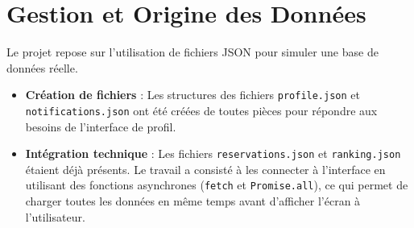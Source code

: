\documentclass[12pt,a4paper]{article}
\begin{document}
\section*{Gestion et Origine des Données}
Le projet repose sur l'utilisation de fichiers JSON pour simuler une base de données réelle.
\begin{itemize}
    \item \textbf{Création de fichiers} : Les structures des fichiers \texttt{profile.json} et \texttt{notifications.json} ont été créées de toutes pièces pour répondre aux besoins de l'interface de profil.
    \item \textbf{Intégration technique} : Les fichiers \texttt{reservations.json} et \texttt{ranking.json} étaient déjà présents. Le travail a consisté à les connecter à l'interface en utilisant des fonctions asynchrones (\texttt{fetch} et \texttt{Promise.all}), ce qui permet de charger toutes les données en même temps avant d'afficher l'écran à l'utilisateur.
\end{itemize}
\end{document}
